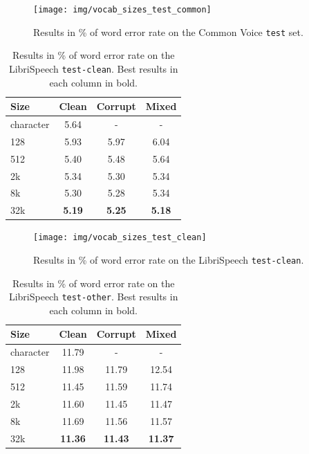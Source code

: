\begin{figure}[p]
	\centering
	\texttt{[image: img/vocab\_sizes\_test\_common]}
	\caption[Results on the Common Voice \texttt{test} set]{Results in \% of word error rate on the Common Voice \texttt{test} set.}
	\label{fig:vocab_sizes_common_graph}
\end{figure}


\begin{table}[p]
	\centering
	\begin{tabular}{l|ccc}
		\bf Size & \bf Clean & \bf Corrupt & \bf Mixed \\
		\hline
		
		character    &    5.64    &    -    &    - \\
		128    &    5.93    &    5.97    &    6.04 \\
		512    &    5.40    &    5.48    &    5.64 \\
		2k    &    5.34    &    5.30    &    5.34 \\
		8k    &    5.30    &    5.28    &    5.34 \\
		32k    &    \textbf{5.19}    &    \textbf{5.25}    &    \textbf{5.18} \\
		
	\end{tabular}
	
	\caption[Results on the LibriSpeech \texttt{test-clean}]{Results in \% of word error rate on the LibriSpeech \texttt{test-clean}. Best results in each column in bold.}
	\label{tab:results_vocabularies_libri_clean}
\end{table}

\begin{figure}[p]
	\centering
	\texttt{[image: img/vocab\_sizes\_test\_clean]}
	\caption[Results on the LibriSpeech \texttt{test-clean}]{Results in \% of word error rate on the LibriSpeech \texttt{test-clean}.}
	\label{fig:vocab_sizes_test_clean}
\end{figure}

\begin{table}[p]
	\centering
	\begin{tabular}{l|ccc}
		\bf Size & \bf Clean & \bf Corrupt & \bf Mixed \\
		\hline
		character    &    11.79    &    -    &    - \\
		128    &    11.98    &    11.79    &    12.54\\
		512    &    11.45    &    11.59    &    11.74\\
		2k    &    11.60    &    11.45    &    11.47\\
		8k    &    11.69    &    11.56    &    11.57\\
		32k    &    \textbf{11.36}    &    \textbf{11.43}    &    \textbf{11.37}\\
		
	\end{tabular}
	
	\caption[Results on the LibriSpeech \texttt{test-other}]{Results in \% of word error rate on the LibriSpeech \texttt{test-other}. Best results in each column in bold.}
	\label{tab:results_vocabularies_libri_other}
\end{table}

